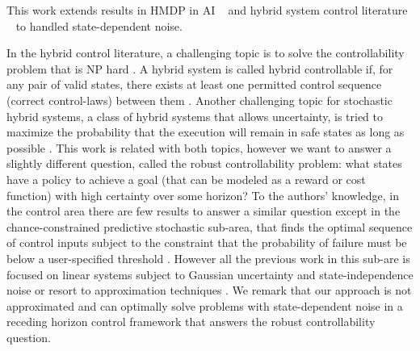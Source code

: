 

This work extends results in HMDP in AI
~\cite{boyan01,feng04,li05,kveton06,phase07,hao09,sdp_aaai} and hybrid
system control literature ~\cite{Henzinger:1997,Hu:2000,DeSHee:2009}
to handled state-dependent noise.

In the hybrid control literature, a challenging topic is to solve the
controllability problem that is NP hard \cite{Blondel:1999}. A hybrid
system is called hybrid controllable if, for any pair of valid states,
there exists at least one permitted control sequence (correct
control-laws) between them \cite{Tittus:1998,Yang:2007}.  Another
challenging topic for stochastic hybrid systems, a class of hybrid
systems that allows uncertainty, is tried to maximize the probability
that the execution will remain in safe states as long as
possible \cite{Hu:2000}.  This work is related with both topics,
however we want to answer a slightly different question, called the
robust controllability problem: what states have a policy to achieve a
goal (that can be modeled as a reward or cost function) with high
certainty over some horizon?  To the authors’ knowledge, in the
control area there are few results to answer a similar question except
in the chance-constrained predictive stochastic sub-area, that finds
the optimal sequence of control inputs subject to the constraint that
the probability of failure must be below a user-specified
threshold \cite{Blackmore:2011}. However all the previous work in this
sub-are is focused on linear systems subject to Gaussian uncertainty
and state-independence
noise \cite{Schwarm:1999,Li:2002,Ono:2008,Blackmore:2011} or resort to
approximation techniques \cite{Blackmore:2010}.  We remark that 
our approach is not approximated and can optimally solve problems with
state-dependent noise in a receding horizon control framework that
answers the robust controllability question.

 
 




